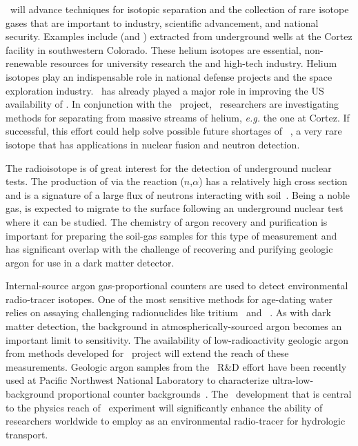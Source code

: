 \GADMC\ will advance techniques for isotopic separation and the collection of rare isotope gases that are important to industry, scientific advancement, and national security.  Examples include  (and ) extracted from underground  wells at the Cortez facility in southwestern Colorado.  These helium isotopes are essential, non-renewable resources for university research the and high-tech industry.  Helium isotopes play an indispensable role in national defense projects and the space exploration industry.  \GADMC\ has already played a major role in improving the US availability of .  In conjunction with the \Urania\ project, \GADMC\ researchers are investigating methods for separating  from massive streams of helium, {\it e.g.} the one at Cortez.  If successful, this effort could help solve possible future shortages of ~\cite{Shea:2010vz}, a very rare isotope that has applications in nuclear fusion and neutron detection.

The  radioisotope is of great interest for the detection of underground nuclear tests.  The production of  via the reaction ($n$,$\alpha$) has a relatively high cross section and is a signature of a large flux of neutrons interacting with soil~\cite{Riedmann:2011ht}.  Being a noble gas,  is expected to migrate to the surface following an underground nuclear test where it can be studied.  The chemistry of argon recovery and purification is important for preparing the soil-gas samples for this type of measurement and has significant overlap with the challenge of recovering and purifying geologic argon for use in a dark matter detector.  

Internal-source argon gas-proportional counters are used to detect environmental radio-tracer isotopes.  One of the most sensitive methods for age-dating water relies on assaying challenging radionuclides like tritium~\cite{Theodorsson:1999dn} and ~\cite{Martoff:1992bg}.  As with dark matter detection, the  background in atmospherically-sourced argon becomes an important limit to sensitivity. The availability of low-radioactivity geologic argon from methods developed for \DSk\ project will extend the reach of these measurements. Geologic argon samples from the \GADMC\ R\&D effort have been recently used at Pacific Northwest National Laboratory to characterize ultra-low-background proportional counter backgrounds~\cite{Aalseth:2009je,Seifert:2012ip}.  The \UAr\ development that is central to the physics reach of \DSks\ experiment will significantly enhance the ability of researchers worldwide to employ  as an environmental radio-tracer for hydrologic transport.

